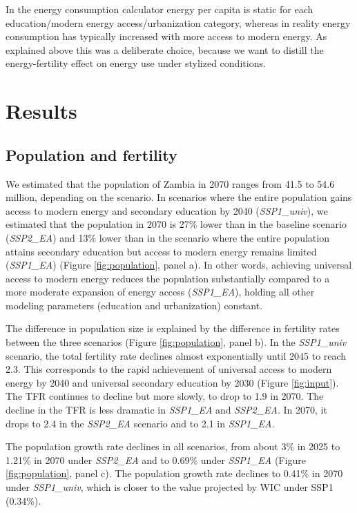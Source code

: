 \documentclass[
]{article}
\begin{document}
In the energy consumption calculator energy per capita is static for each education/modern energy access/urbanization category, whereas in reality energy consumption has typically increased with more access to modern energy. As explained above this was a deliberate choice, because we want to distill the energy-fertility effect on energy use under stylized conditions.

\newpage

\hypertarget{results}{%
\section{Results}\label{results}}

\hypertarget{population-and-fertility}{%
\subsection{Population and fertility}\label{population-and-fertility}}

We estimated that the population of Zambia in 2070 ranges from 41.5 to 54.6 million, depending on the scenario. In scenarios where the entire population gains access to modern energy and secondary education by 2040 (\emph{SSP1\_univ}), we estimated that the population in 2070 is 27\% lower than in the baseline scenario (\emph{SSP2\_EA}) and 13\% lower than in the scenario where the entire population attains secondary education but access to modern energy remains limited (\emph{SSP1\_EA}) (Figure \ref{fig:population}, panel a). In other words, achieving universal access to modern energy reduces the population substantially compared to a more moderate expansion of energy access (\emph{SSP1\_EA}), holding all other modeling parameters (education and urbanization) constant.

The difference in population size is explained by the difference in fertility rates between the three scenarios (Figure \ref{fig:population}, panel b). In the \emph{SSP1\_univ} scenario, the total fertility rate declines almost exponentially until 2045 to reach 2.3. This corresponds to the rapid achievement of universal access to modern energy by 2040 and universal secondary education by 2030 (Figure \ref{fig:input}). The TFR continues to decline but more slowly, to drop to 1.9 in 2070. The decline in the TFR is less dramatic in \emph{SSP1\_EA} and \emph{SSP2\_EA}. In 2070, it drops to 2.4 in the \emph{SSP2\_EA} scenario and to 2.1 in \emph{SSP1\_EA}.

The population growth rate declines in all scenarios, from about 3\% in 2025 to 1.21\% in 2070 under \emph{SSP2\_EA} and to 0.69\% under \emph{SSP1\_EA} (Figure \ref{fig:population}, panel c). The population growth rate declines to 0.41\% in 2070 under \emph{SSP1\_univ}, which is closer to the value projected by WIC under SSP1 (0.34\%).
\end{document}
